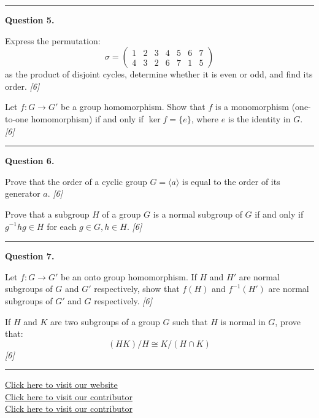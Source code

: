 \documentclass[11pt,a4paper]{article}
\newcommand{\pts}[1]{\hfill   \textit{[#1]}}
\begin{document}
\medskip\rule{\linewidth}{0.2pt}

\medskip


\noindent   \textbf{Question 5.}

\begin{parts}
  \item Express the permutation:
  \[ \sigma = 
\begin{pmatrix} 1 & 2 & 3 & 4 & 5 & 6 & 7 \\ 4 & 3 & 2 & 6 & 7 & 1 & 5 \end{pmatrix} \]
  as the product of disjoint cycles, determine whether it is even or odd, and find its order. \pts{6}
  \item Let $f : G \rightarrow G'$ be a group homomorphism. Show that $f$ is a monomorphism (one-to-one homomorphism) if and only if $\ker f = \{e\}$, where $e$ is the identity in $G$. \pts{6}
\end{parts}

\medskip\rule{\linewidth}{0.2pt}

\medskip


\noindent   \textbf{Question 6.}

\begin{parts}
  \item Prove that the order of a cyclic group $G = \langle a \rangle$ is equal to the order of its generator $a$. \pts{6}
  \item Prove that a subgroup $H$ of a group $G$ is a normal subgroup of $G$ if and only if $g^{-1}hg \in H$ for each $g \in G, h \in H$. \pts{6}
\end{parts}

\medskip\rule{\linewidth}{0.2pt}

\medskip


\noindent   \textbf{Question 7.}

\begin{parts}
  \item Let $f : G \rightarrow G'$ be an onto group homomorphism. If $H$ and $H'$ are normal subgroups of $G$ and $G'$ respectively, show that $f(H)$ and $f^{-1}(H')$ are normal subgroups of $G'$ and $G$ respectively. \pts{6}
  \item If $H$ and $K$ are two subgroups of a group $G$ such that $H$ is normal in $G$, prove that:
  \[ (HK)/H \cong K/(H \cap K) \] \pts{6}
\end{parts}

\vfill
\rule{\linewidth}{0.4pt}

\begin{center}\small
\href{https://bhu-exam.vercel.app/}{Click here to visit our website}\\[4pt]
\href{https://me-aryan.vercel.app/}{Click here to visit our contributor}\\[4pt]
\href{https://quashan-me.vercel.app/}{Click here to visit our contributor}
\end{center}
\end{document}
